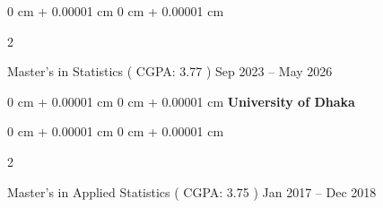 \documentclass[10pt, letterpaper]{article}
\newenvironment{highlights}{
    \begin{itemize}[
        topsep=0.10 cm,
        parsep=0.10 cm,
        partopsep=0pt,
        itemsep=0pt,
        leftmargin=0 cm + 10pt
    ]
}{
    \end{itemize}
} %
\newenvironment{onecolentry}{
    \begin{adjustwidth}{
        0 cm + 0.00001 cm
    }{
        0 cm + 0.00001 cm
    }
}{
    \end{adjustwidth}
} %
\newenvironment{twocolentry}[2][]{
    \onecolentry
    \def\secondColumn{#2}
    \setcolumnwidth{\fill, 4.5 cm}
    \begin{paracol}{2}
}{
    \switchcolumn \raggedleft \secondColumn
    \end{paracol}
    \endonecolentry
} %
\begin{document}
        \begin{twocolentry}{
            Sep 2023 – May 2026
        }
    Master's in Statistics ( CGPA: 3.77 )\end{twocolentry}
  
               

    \vspace{0.20 cm}
    \begin{onecolentry}{
    \textbf{University of Dhaka}
    }
    \end{onecolentry}
    \begin{twocolentry}{
            Jan 2017 – Dec 2018
        }
         Master's in Applied Statistics ( CGPA: 3.75 )\end{twocolentry}
        \vspace{0.10 cm}
\end{document}
